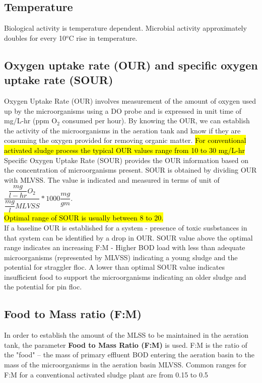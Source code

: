 \subsection{Temperature}%
Biological activity is temperature dependent.  Microbial activity approximately doubles for every 10$^o$C rise in temperature.\\
\subsection{Oxygen uptake rate (OUR) and specific oxygen uptake rate (SOUR)}%

Oxygen Uptake Rate (OUR) involves measurement of the amount of oxygen used up by the microorganisms using a DO probe and is expressed in unit time of mg/L-hr (ppm O$_2$ consumed per hour). By knowing the OUR, we can establish the activity of the microorganisms in the aeration tank and know if they are consuming the oxygen provided for removing organic matter.  \hl{For conventional activated sludge process the typical OUR values range from 10 to 30 mg/L-hr}\\

Specific Oxygen Uptake Rate (SOUR) provides the OUR information based on the concentration of microorganisms present. SOUR is obtained by dividing OUR with MLVSS. The value is indicated and measured in terms of unit of $\dfrac{\dfrac{mg}{l-hr}O_2}{\dfrac{mg}{l}MLVSS}*1000\dfrac{mg}{gm}$.\\ \hl{Optimal range of SOUR is usually between 8 to 20.}\\
If a baseline OUR is established for a system - presence of toxic susbstances in that system can be identified by a drop in OUR. SOUR value above the optimal range indicates an increasing F:M - Higher BOD load with less than adequate microorganisms (represented by MLVSS) indicating a young sludge and the potential for straggler floc.  A lower than optimal SOUR value indicates insufficient food to support the microorganisms indicating an older sludge and the potential for pin floc.

\subsection{Food to Mass ratio (F:M)}
In order to establish the amount of the MLSS to be maintained in the aeration tank, the parameter \textbf{Food to Mass Ratio (F:M)} is used.  F:M is the ratio of the "food" – the mass of primary effluent BOD entering the aeration basin to the mass of the microorganisms in the aeration basin \textemdash MLVSS.  Common ranges for F:M for a conventional activated sludge plant are from 0.15 to 0.5\\
